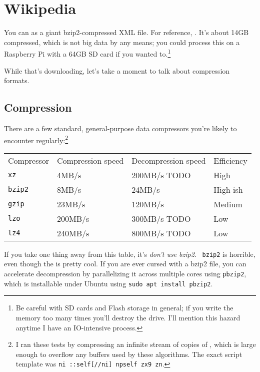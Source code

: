 \section{Wikipedia}
You can
 as a giant bzip2-compressed XML file. For
reference,
. It's about 14GB compressed, which is not
big data by any means; you could process this on a Raspberry Pi with a 64GB SD
card if you wanted to.\footnote{Be careful with SD cards and Flash storage in
general; if you write the memory too many times you'll destroy the drive. I'll
mention this hazard anytime I have an IO-intensive process.}

While that's downloading, let's take a moment to talk about compression formats.

\subsection{Compression}
There are a few standard, general-purpose data compressors you're likely to
encounter regularly:\footnote{I ran these tests by compressing an infinite
stream of copies of , which is large enough to overflow any buffers used by these
algorithms. The exact script template was {\tt ni ::self[//ni] npself zx9 zn}.}

\begin{table}[ht]
\begin{tabular}{llll}
  Compressor  & Compression speed & Decompression speed & Efficiency \\
  {\tt xz}    & 4MB/s             & 200MB/s TODO        & High \\
  {\tt bzip2} & 8MB/s             & 24MB/s              & High-ish \\
  {\tt gzip}  & 23MB/s            & 120MB/s             & Medium \\
  {\tt lzo}   & 200MB/s           & 300MB/s TODO        & Low \\
  {\tt lz4}   & 240MB/s           & 800MB/s TODO        & Low
\end{tabular}
\end{table}

If you take one thing away from this table, it's {\it don't use bzip2}. {\tt
bzip2} is horrible, even though the
is pretty cool. If you are ever cursed with a bzip2 file, you can accelerate
decompression by parallelizing it across multiple cores using {\tt pbzip2},
which is installable under Ubuntu using {\tt sudo apt install pbzip2}.

